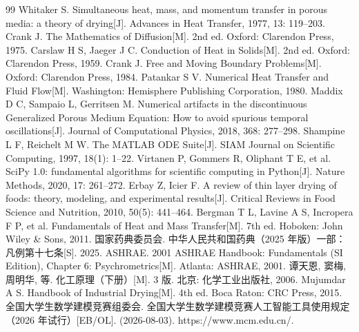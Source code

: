 \documentclass[a4paper,12pt]{ctexart}
\title{\vspace{-1.2cm}{\zihao{3}\heiti\bfseries 药材热风烘干的径向传热传质模型与干燥规律分析}}
\author{}
\date{}
\numberwithin{equation}{section}
\begin{document}
\maketitle
\thispagestyle{plain}
\vspace{-1.2cm}



\newpage
















\begin{thebibliography}{99}
\setlength{\itemsep}{1pt}
\small
{} Whitaker S. Simultaneous heat, mass, and momentum transfer in porous media: a theory of drying[J]. Advances in Heat Transfer, 1977, 13: 119--203.
 Crank J. The Mathematics of Diffusion[M]. 2nd ed. Oxford: Clarendon Press, 1975.
 Carslaw H S, Jaeger J C. Conduction of Heat in Solids[M]. 2nd ed. Oxford: Clarendon Press, 1959.
 Crank J. Free and Moving Boundary Problems[M]. Oxford: Clarendon Press, 1984.
 Patankar S V. Numerical Heat Transfer and Fluid Flow[M]. Washington: Hemisphere Publishing Corporation, 1980.
 Maddix D C, Sampaio L, Gerritsen M. Numerical artifacts in the discontinuous Generalized Porous Medium Equation: How to avoid spurious temporal oscillations[J]. Journal of Computational Physics, 2018, 368: 277--298.
 Shampine L F, Reichelt M W. The MATLAB ODE Suite[J]. SIAM Journal on Scientific Computing, 1997, 18(1): 1--22.
 Virtanen P, Gommers R, Oliphant T E, et al. SciPy 1.0: fundamental algorithms for scientific computing in Python[J]. Nature Methods, 2020, 17: 261--272.
 Erbay Z, Icier F. A review of thin layer drying of foods: theory, modeling, and experimental results[J]. Critical Reviews in Food Science and Nutrition, 2010, 50(5): 441--464.
 Bergman T L, Lavine A S, Incropera F P, et al. Fundamentals of Heat and Mass Transfer[M]. 7th ed. Hoboken: John Wiley \& Sons, 2011.
 国家药典委员会. 中华人民共和国药典（2025 年版）一部：凡例第十七条[S]. 2025.
 ASHRAE. 2001 ASHRAE Handbook: Fundamentals (SI Edition), Chapter 6: Psychrometrics[M]. Atlanta: ASHRAE, 2001.
 谭天恩, 窦梅, 周明华, 等. 化工原理（下册）[M]. 3 版. 北京: 化学工业出版社, 2006.
 Mujumdar A S. Handbook of Industrial Drying[M]. 4th ed. Boca Raton: CRC Press, 2015.
 全国大学生数学建模竞赛组委会. 全国大学生数学建模竞赛人工智能工具使用规定（2026 年试行）[EB/OL]. (2026-08-03). https://www.mcm.edu.cn/.
\end{thebibliography}

\newpage

\end{document}
